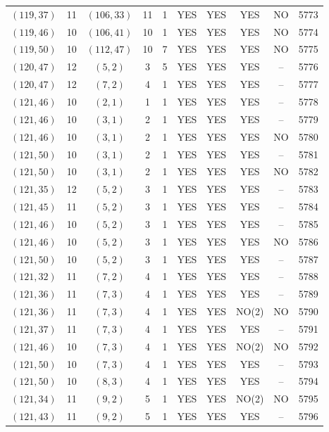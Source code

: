 \begin{longtable}{|c|c|c|c|c|c|c|c|c|c|}
$(119, 37)$ & 11 & $(106, 33)$ & 11 & 1 & YES & YES & YES & NO & 5773\\
$(119, 46)$ & 10 & $(106, 41)$ & 10 & 1 & YES & YES & YES & NO & 5774\\
$(119, 50)$ & 10 & $(112, 47)$ & 10 & 7 & YES & YES & YES & NO & 5775\\
$(120, 47)$ & 12 & $(5, 2)$ & 3 & 5 & YES & YES & YES & -- & 5776\\
$(120, 47)$ & 12 & $(7, 2)$ & 4 & 1 & YES & YES & YES & -- & 5777\\
$(121, 46)$ & 10 & $(2, 1)$ & 1 & 1 & YES & YES & YES & -- & 5778\\
$(121, 46)$ & 10 & $(3, 1)$ & 2 & 1 & YES & YES & YES & -- & 5779\\
$(121, 46)$ & 10 & $(3, 1)$ & 2 & 1 & YES & YES & YES & NO & 5780\\
$(121, 50)$ & 10 & $(3, 1)$ & 2 & 1 & YES & YES & YES & -- & 5781\\
$(121, 50)$ & 10 & $(3, 1)$ & 2 & 1 & YES & YES & YES & NO & 5782\\
$(121, 35)$ & 12 & $(5, 2)$ & 3 & 1 & YES & YES & YES & -- & 5783\\
$(121, 45)$ & 11 & $(5, 2)$ & 3 & 1 & YES & YES & YES & -- & 5784\\
$(121, 46)$ & 10 & $(5, 2)$ & 3 & 1 & YES & YES & YES & -- & 5785\\
$(121, 46)$ & 10 & $(5, 2)$ & 3 & 1 & YES & YES & YES & NO & 5786\\
$(121, 50)$ & 10 & $(5, 2)$ & 3 & 1 & YES & YES & YES & -- & 5787\\
$(121, 32)$ & 11 & $(7, 2)$ & 4 & 1 & YES & YES & YES & -- & 5788\\
$(121, 36)$ & 11 & $(7, 3)$ & 4 & 1 & YES & YES & YES & -- & 5789\\
$(121, 36)$ & 11 & $(7, 3)$ & 4 & 1 & YES & YES & NO(2) & NO & 5790\\
$(121, 37)$ & 11 & $(7, 3)$ & 4 & 1 & YES & YES & YES & -- & 5791\\
$(121, 46)$ & 10 & $(7, 3)$ & 4 & 1 & YES & YES & NO(2) & NO & 5792\\
$(121, 50)$ & 10 & $(7, 3)$ & 4 & 1 & YES & YES & YES & -- & 5793\\
$(121, 50)$ & 10 & $(8, 3)$ & 4 & 1 & YES & YES & YES & -- & 5794\\
$(121, 34)$ & 11 & $(9, 2)$ & 5 & 1 & YES & YES & NO(2) & NO & 5795\\
$(121, 43)$ & 11 & $(9, 2)$ & 5 & 1 & YES & YES & YES & -- & 5796\\

\end{longtable}
